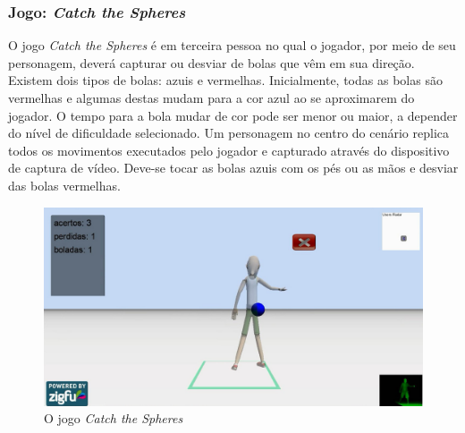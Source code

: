 
\subsubsection{Jogo: \textit{Catch the Spheres}}
O jogo \textit{Catch the Spheres} é em terceira pessoa no qual o jogador, por meio de seu personagem, deverá capturar ou desviar de bolas que vêm em sua direção. Existem dois tipos de bolas: azuis e vermelhas. Inicialmente, todas as bolas são vermelhas e algumas destas mudam para a cor azul ao se aproximarem do jogador. O tempo para a bola mudar de cor pode ser menor ou maior, a depender do nível de dificuldade selecionado. Um personagem no centro do cenário replica todos os movimentos executados pelo jogador e capturado através do dispositivo de captura de vídeo. Deve-se tocar as bolas azuis com os pés ou as mãos e desviar das bolas vermelhas.


\begin{figure}[!htb]
     \centering
     \includegraphics[width=.8\textwidth]{./img/catch-the-spheres.png}
     \caption{O jogo \emph{Catch the Spheres}}
     \label{img:catch}
\end{figure}


